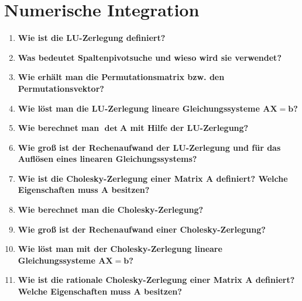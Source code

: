 \section{Numerische Integration}
	\begin{enumerate}
		\item \textbf{Wie ist die LU-Zerlegung definiert?} \\
		
		\item \textbf{Was bedeutet Spaltenpivotsuche und wieso wird sie verwendet?} \\
		
		\item \textbf{Wie erhält man die Permutationsmatrix bzw. den Permutationsvektor?} \\
		
		\item \textbf{Wie löst man die LU-Zerlegung lineare Gleichungssysteme \(\mathbf{AX=b}\)?} \\
		
		\item \textbf{Wie berechnet man \(\mathbf{\det A}\) mit Hilfe der LU-Zerlegung?} \\
		
		\item \textbf{Wie groß ist der Rechenaufwand der LU-Zerlegung und für das Auflösen eines linearen Gleichungssystems?} \\
		
		\item \textbf{Wie ist die Cholesky-Zerlegung einer Matrix A definiert? Welche Eigenschaften muss A besitzen?} \\
		
		\item \textbf{Wie berechnet man die Cholesky-Zerlegung?} \\
		
		\item \textbf{Wie groß ist der Rechenaufwand einer Cholesky-Zerlegung?} \\
		
		\item \textbf{Wie löst man mit der Cholesky-Zerlegung lineare Gleichungssysteme \(\mathbf{AX=b}\)?} \\
		
		\item \textbf{Wie ist die rationale Cholesky-Zerlegung einer Matrix A definiert? Welche Eigenschaften muss A besitzen?} \\
		

\end{enumerate}
